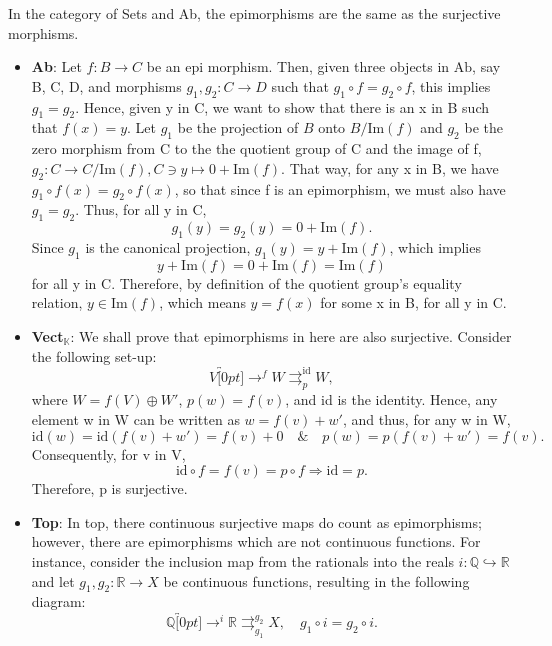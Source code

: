 \documentclass[../category_theory.tex]{subfiles}
\begin{document}
\begin{example}
	In the category of Sets and Ab, the epimorphisms are the same as the surjective morphisms.
	\begin{itemize}
		\item \textbf{Ab}: Let \(f:B\rightarrow C\) be an epi morphism. Then, given three objects in \(\mathrm{Ab}\), say B, C, D, and morphisms \(g_1, g_2:C\rightarrow D\) such that \(g_1\circ f = g_2\circ f\), this implies \(g_1=g_2\). Hence, given y in C, we want to show that there is an x in B such that \(f(x)=y\). Let \(g_1\) be the projection of \(B\) onto \(B/\mathrm{Im}(f)\) and \(g_2\) be the zero morphism from C to the the quotient group of C and the image of f, \(g_2:C\rightarrow C/\mathrm{Im}(f), C\ni y\mapsto 0+\mathrm{Im}(f)\). That way, for any x in B, we have \(g_1\circ f(x)=g_2 \circ f(x)\), so that since f is an epimorphism, we must also have \(g_1 = g_2\). Thus, for all y in C,
		      \[
			      g_1(y)=g_2(y)=0+\mathrm{Im}(f).
		      \]
		      Since \(g_1\) is the canonical projection, \(g_1(y)=y+\mathrm{Im}(f)\), which implies
		      \[
			      y+\mathrm{Im}(f)=0+\mathrm{Im}(f)=\mathrm{Im}(f)
		      \]
		      for all y in C. Therefore, by definition of the quotient group's equality relation, \(y\in \mathrm{Im}(f)\), which means \(y=f(x)\) for some x in B, for all y in C.
		\item \textbf{Vect}\(_{\mathbb{K}}\): We shall prove that epimorphisms in here are also surjective. Consider the following set-up:
		      \[
			      V\overbracket[0pt]{\longrightarrow}^{f}W\rightrightarrows_{p}^{\mathrm{id}}W,
		      \]
		      where \(W = f(V)\oplus W'\), \(p(w)=f(v)\), and id is the identity. Hence, any element w in W can be written as \(w=f(v)+w'\), and thus, for any w in W,
		      \[
			      \mathrm{id}(w)=\mathrm{id}(f(v)+w')=f(v) + 0\quad\&\quad p(w)=p(f(v)+w')=f(v).
		      \]
		      Consequently, for v in V,
		      \[
			      \mathrm{id}\circ f = f(v) = p \circ f \Rightarrow \mathrm{id}=p.
		      \]
		      Therefore, p is surjective.
		\item \textbf{Top}: In top, there continuous surjective maps do count as epimorphisms; however, there are epimorphisms which are not continuous functions. For instance, consider the inclusion map from the rationals into the reals \(i:\mathbb{Q}\hookrightarrow \mathbb{R}\) and let \(g_1, g_2:\mathbb{R}\rightarrow X\) be continuous functions, resulting in the following diagram:
		      \[
			      \mathbb{Q}\overbracket[0pt]{\rightarrow}^{i}\mathbb{R}\rightrightarrows_{g_1}^{g_2}X,\quad g_1\circ i=g_2\circ i.
\]
\end{itemize}
\end{example}
\end{document}
